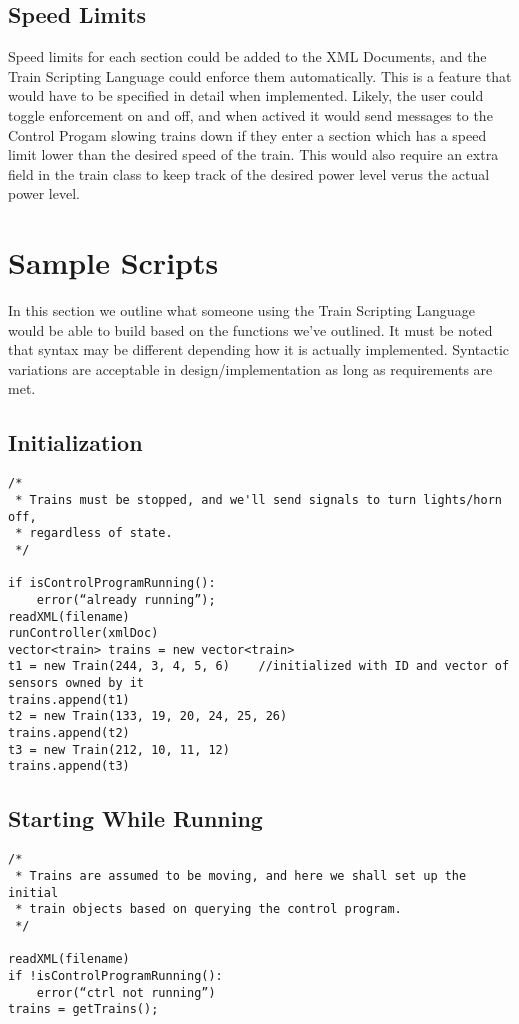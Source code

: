 \documentclass[a4paper,11pt,notitlepage]{article}
\def\TSL{Train Scripting Language\xspace}
\def\CS{Control Progam\xspace}
\begin{document}
\subsection{Speed Limits}
Speed limits for each section could be added to the XML Documents, and the \TSL could enforce them automatically. This is a feature that would have to be specified in detail when implemented. Likely, the user could toggle enforcement on and off, and when actived it would send messages to the \CS slowing trains down if they enter a section which has a speed limit lower than the desired speed of the train. This would also require an extra field in the train class to keep track of the desired power level verus the actual power level.

\newpage
\section{Sample Scripts}
In this section we outline what someone using the \TSL would be able to build based on the functions we've outlined. It must be noted that syntax may be different depending how it is actually implemented. Syntactic variations are acceptable in design/implementation as long as requirements are met.

\subsection{Initialization}
\begin{verbatim}
/*
 * Trains must be stopped, and we'll send signals to turn lights/horn off,
 * regardless of state.
 */

if isControlProgramRunning():
    error(“already running”);
readXML(filename)
runController(xmlDoc)
vector<train> trains = new vector<train>
t1 = new Train(244, 3, 4, 5, 6)    //initialized with ID and vector of sensors owned by it
trains.append(t1)
t2 = new Train(133, 19, 20, 24, 25, 26)
trains.append(t2)
t3 = new Train(212, 10, 11, 12)
trains.append(t3)
\end{verbatim}

\subsection{Starting While Running}
\begin{verbatim}
/*
 * Trains are assumed to be moving, and here we shall set up the initial
 * train objects based on querying the control program.
 */

readXML(filename)
if !isControlProgramRunning():
    error(“ctrl not running”)
trains = getTrains();
\end{verbatim}
\end{document}
